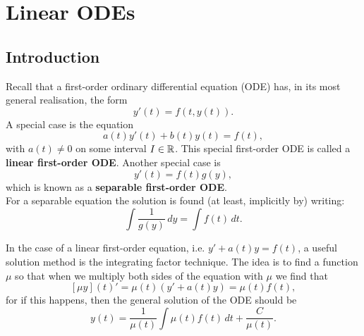 \chapter{Linear ODEs}

\section{Introduction}
Recall that a first-order ordinary differential equation (ODE) has, in its most general realisation, the form
\[y'(t) = f(t, y(t)).\]
A special case is the equation
\[a(t)y'(t) + b(t)y(t) = f(t),\]
with \(a(t) \neq 0\) on some interval \(I \in \mathbb{R}\). This special first-order ODE is called a \textbf{linear first-order ODE}. Another special case is
\[y'(t) = f(t)g(y),\]
which is known as a \textbf{separable first-order ODE}. \\

For a separable equation the solution is found (at least, implicitly by) writing:
\[\int \frac{1}{g(y)} \, dy = \int f(t) \, dt.\]


In the case of a linear first-order equation, i.e. \(y' + a(t)y = f(t)\), a useful solution method is the integrating factor technique. The idea is to find a function \(\mu\) so that when we multiply both sides of the equation with \(\mu\) we find that
\[[\mu y](t)' = \mu(t)(y' + a(t)y) = \mu(t)f(t),\]
for if this happens, then the general solution of the ODE should be
\[y(t) = \frac{1}{\mu(t)}\int \mu(t)f(t) \, dt + \frac{C}{\mu(t)}.\]



